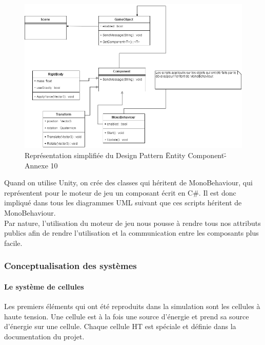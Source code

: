 \documentclass[a4paper]{article}
\begin{document}
    \begin{figure}[H]
        \centering
        \includegraphics[scale=0.45]{img/DiagClasseEntityComponent}
        \caption{Représentation simplifiée du Design Pattern \"Entity Component\" - Annexe 10}
    \end{figure} 

    Quand on utilise Unity, on crée des classes qui héritent de MonoBehaviour, qui représentent pour le moteur de jeu un composant écrit en C\#. Il est donc impliqué dans tous les diagrammes UML suivant que ces scripts héritent de MonoBehaviour. \\

    Par nature, l'utilisation du moteur de jeu nous pousse à rendre tous nos attributs publics afin de rendre l'utilisation et la communication entre les composants plus facile. \\

    \subsubsection{Conceptualisation des systèmes}

    \paragraph{Le système de cellules}

    Les premiers éléments qui ont été reproduits dans la simulation sont les cellules à haute tension. Une cellule est à la fois une source d'énergie et prend sa source d'énergie sur une cellule. Chaque cellule HT est spéciale et définie dans la documentation du projet. \\
\end{document}
